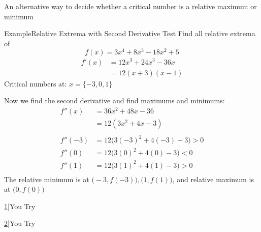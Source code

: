 \documentclass{MathNotes}
\newenvironment{example}[1]{\begin{BlueBox}{Example}{#1}}{\end{BlueBox}}
\newenvironment{practice}[2]{\begin{PurpleBox}{\texorpdfstring{#1}\Big|You Try}{#2}}{\end{PurpleBox}}
\begin{document}
\begin{displayquote}
	An alternative way to decide whether a critical number is a
	relative maximum or minimum
\end{displayquote}

\begin{example}{Relative Extrema with Second Derivative Test}
	Find all relative extrema of $$f(x)=3x^4+8x^3-18x^2+5$$
	\begin{align*}
		f'(x) & =12x^3+24x^3-36x \\
		      & =12(x+3)(x-1)
	\end{align*}
	Critical numbers at: $x=\{-3, 0, 1\}$

	Now we find the second derivative and find maximums and minimums:
	\begin{align*}
		f''(x)  & =36x^2+48x-36                  \\
		        & =12(3x^2+4x-3)                 \\
		\\
		f''(-3) & =12\big(3(-3)^2+4(-3)-3\big)>0 \\
		f''(0)  & =12\big(3(0)^2+4(0)-3\big)<0   \\
		f''(1)  & =12\big(3(1)^2+4(1)-3\big)>0   \\
	\end{align*}
	The relative minimum is at $\big(-3, f(-3)\big), \big(1, f(1)\big)$,
	and relative maximum is at $\big(0, f(0)\big)$
\end{example}

\begin{multicols}{2}
	\begin{practice}{\hyperref[ans:3.4-1]{1}}{}
		\label{prac:3.4-1}
	\end{practice}
	\begin{practice}{\hyperref[ans:3.4-2]{2}}{}
		\label{prac:3.4-2}
	\end{practice}
\end{multicols}

\end{document}
